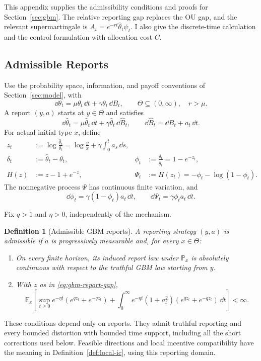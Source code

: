 \documentclass[12pt]{article}
\newtheorem{definition}{Definition}
\newcommand{\E}{\mathbb{E}}
\newcommand{\hth}{\hat\theta}
\newcommand{\hB}{\hat B}
\begin{document}
This appendix supplies the admissibility conditions and proofs for
Section~\ref{sec:gbm}. The relative reporting gap replaces the OU
gap, and the relevant supermartingale is
\(A_t=e^{-rt}\hth_t\psi_t\). I also give the discrete-time
calculation and the control formulation with allocation cost \(C\).

\subsection{Admissible Reports}
\label{app:gbm-reports}

Use the probability space, information, and payoff conventions of
Section~\ref{sec:model}, with
\[
  \dd\theta_t=\mu\theta_t\,\dd t+\gamma\theta_t\,\dd B_t,
  \qquad \Theta\subseteq(0,\infty),\quad r>\mu.
\]
A report \((y,a)\) starts at \(y\in\Theta\) and satisfies
\[
  \dd\hth_t=\mu\hth_t\,\dd t+\gamma\hth_t\,\dd\hB_t,
  \qquad \dd\hB_t=\dd B_t+a_t\,\dd t.
\]
For actual initial type \(x\), define
\begin{equation}\label{eq:gbm-report-gap}
\begin{aligned}
  z_t&:=\log\frac{\hth_t}{\theta_t}
       =\log\frac yx+\gamma\int_0^t a_s\,\dd s,\\
  \delta_t&:=\hth_t-\theta_t,
  &\phi_t&:=\frac{\delta_t}{\hth_t}=1-e^{-z_t},\\
  H(z)&:=z-1+e^{-z},
  &\Psi_t&:=H(z_t)=-\phi_t-\log(1-\phi_t).
\end{aligned}
\end{equation}
The nonnegative process \(\Psi\) has continuous finite variation,
and
\begin{equation}\label{eq:gbm-potential-dynamics}
  \dd\phi_t=\gamma(1-\phi_t)a_t\,\dd t,
  \qquad \dd\Psi_t=\gamma\phi_ta_t\,\dd t.
\end{equation}

Fix \(q>1\) and \(\eta>0\), independently of the mechanism.
\begin{definition}[Admissible GBM reports]\label{def:gbm-reports}
A reporting strategy \((y,a)\) is admissible if \(a\) is progressively
measurable and, for every \(x\in\Theta\):
\begin{enumerate}[label=\textnormal{(G\arabic*)},leftmargin=2.7em]
\item On every finite horizon, its induced report law under
\(\mathbb P_x\) is absolutely continuous with respect to the truthful
GBM law starting from \(y\).
\item With \(z\) as in \eqref{eq:gbm-report-gap},
\begin{equation}\label{eq:gbm-report-integrability}
  \E_x\!\left[
    \sup_{t\geq0}e^{-\eta t}(e^{qz_t}+e^{-qz_t})
    +\int_0^\infty e^{-\eta t}(1+a_t^2)
      (e^{qz_t}+e^{-qz_t})\,\dd t
  \right]<\infty.
\end{equation}
\end{enumerate}
\end{definition}
These conditions depend only on reports. They admit truthful reporting
and every bounded distortion with bounded time support, including all
the short corrections used below. Feasible directions and local
incentive compatibility have the meaning in
Definition~\ref{def:local-ic}, using this reporting domain.
\end{document}
